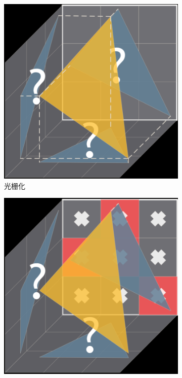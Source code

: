 \begin{figure}
\begin{fullwidth}
	\begin{subfigure}[b]{0.2425\thewidth}
		\includegraphics[width=\textwidth]{figures/vct/vct-voxel-1}
		\caption{光栅化}
	\end{subfigure}
	\begin{subfigure}[b]{0.2425\thewidth}
		\includegraphics[width=\textwidth]{figures/vct/vct-voxel-2}

\end{subfigure}
\end{fullwidth}
\end{figure}
